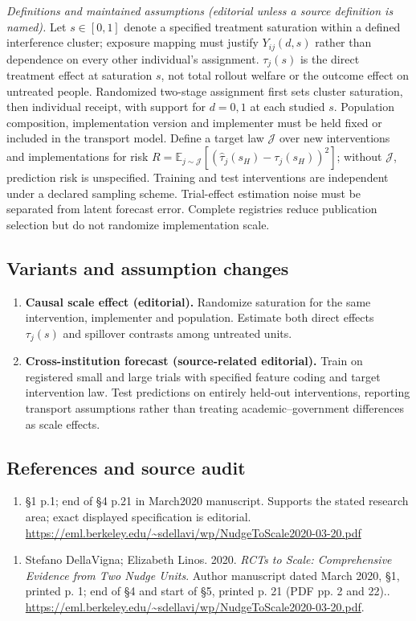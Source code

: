 \documentclass[11pt,a4paper]{article}
\begin{document}
\emph{Definitions and maintained assumptions (editorial unless a source definition is named).} Let \(s\in[0,1]\) denote a specified treatment saturation within a defined interference cluster; exposure mapping must justify \(Y_{ij}(d,s)\) rather than dependence on every other individual’s assignment. \(\tau_j(s)\) is the direct treatment effect at saturation \(s\), not total rollout welfare or the outcome effect on untreated people. Randomized two-stage assignment first sets cluster saturation, then individual receipt, with support for \(d=0,1\) at each studied \(s\). Population composition, implementation version and implementer must be held fixed or included in the transport model. Define a target law \(\mathcal J\) over new interventions and implementations for risk \(R=\mathbb E_{j\sim\mathcal J}[(\widehat\tau_j(s_H)-\tau_j(s_H))^2]\); without \(\mathcal J\), prediction risk is unspecified. Training and test interventions are independent under a declared sampling scheme. Trial-effect estimation noise must be separated from latent forecast error. Complete registries reduce publication selection but do not randomize implementation scale.
\subsection*{Variants and assumption changes}
\begin{enumerate}
\item \textbf{Causal scale effect (editorial).} Randomize saturation for the same intervention, implementer and population. Estimate both direct effects \(\tau_j(s)\) and spillover contrasts among untreated units.
\item \textbf{Cross-institution forecast (source-related editorial).} Train on registered small and large trials with specified feature coding and target intervention law. Test predictions on entirely held-out interventions, reporting transport assumptions rather than treating academic--government differences as scale effects.
\end{enumerate}
\subsection*{References and source audit}
\begin{enumerate}
\item §1 p.1; end of §4 p.21 in March2020 manuscript. Supports the stated research area; exact displayed specification is editorial. \url{https://eml.berkeley.edu/~sdellavi/wp/NudgeToScale2020-03-20.pdf}
\end{enumerate}
\begin{enumerate}\raggedright
\item\hypertarget{definitions:source:30007590:1}{} Stefano DellaVigna; Elizabeth Linos. 2020. \emph{RCTs to Scale: Comprehensive Evidence from Two Nudge Units}. Author manuscript dated March 2020, §1, printed p. 1; end of §4 and start of §5, printed p. 21 (PDF pp. 2 and 22)..
\url{https://eml.berkeley.edu/~sdellavi/wp/NudgeToScale2020-03-20.pdf}.
\end{enumerate}
\end{document}
